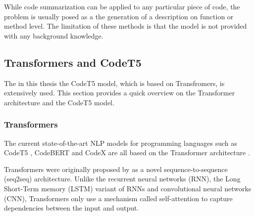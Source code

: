 While code summarization can be applied to any particular piece of code, the problem is usually posed as a the generation of a description on function or method level. The limitation of these methods is that the model is not provided with any background knowledge.

\subsection{Transformers and CodeT5}
The in this thesis the CodeT5 model, which is based on Transfromers, is extensively used. This section provides a quick overview on the Transformer architecture and the CodeT5 model.

\subsubsection{Transformers}
The current state-of-the-art NLP models for programming languages such as CodeT5 \cite{CodeT5}, CodeBERT \cite{CodeBERT} and CodeX \cite{CodeX} are all based on the Transformer architecture \cite{Transformers}.

Transformers were originally proposed by \citeauthor{Transformers} as a novel sequence-to-sequence (seq2seq) architecture. Unlike the recurrent neural networks (RNN), the Long Short-Term memory (LSTM) variant of RNNs and convolutional neural networks (CNN), Transformers only use a mechanism called self-attention to capture dependencies between the input and output. 

